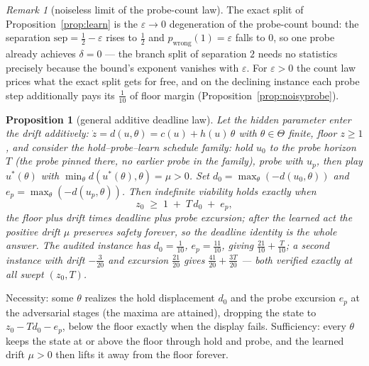 \documentclass[10pt,twocolumn]{article}
\theoremstyle{plain}
\newtheorem{proposition}[theorem]{Proposition}
\theoremstyle{definition}
\theoremstyle{remark}
\newtheorem{remark}[theorem]{Remark}
\begin{document}
\begin{remark}[noiseless limit of the probe-count law]
\label{rem:eps0}
The exact split of Proposition~\ref{prop:learn} is the
\(\varepsilon \to 0\) degeneration of the probe-count bound: the
separation \(\mathrm{sep} = \tfrac12 - \varepsilon\) rises to
\(\tfrac12\) and \(p_{\mathrm{wrong}}(1) = \varepsilon\) falls to
\(0\), so one probe already achieves \(\delta = 0\) --- the branch
split of separation \(2\) needs no statistics precisely because the
bound's exponent vanishes with \(\varepsilon\). For
\(\varepsilon > 0\) the count law prices what the exact split gets
for free, and on the declining instance each probe step additionally
pays its \(\tfrac1{10}\) of floor margin
(Proposition~\ref{prop:noisyprobe}).
\end{remark}

\begin{proposition}[general additive deadline law]\label{prop:additivelaw}
Let the hidden parameter enter the drift additively:
\(\dot z = d(u, \theta) = c(u) + h(u)\,\theta\) with
\(\theta \in \Theta\) finite, floor \(z \ge 1\), and consider the
hold--probe--learn schedule family: hold \(u_{0}\) to the probe horizon
\(T\) (the probe pinned there, no earlier probe in the family), probe
with \(u_{p}\), then play \(u^{*}(\theta)\) with
\(\min_{\theta} d(u^{*}(\theta), \theta) = \mu > 0\). Set
\(d_{0} = \max_{\theta}(-d(u_{0}, \theta))\) and
\(e_{p} = \max_{\theta}(-d(u_{p}, \theta))\). Then indefinite
viability holds exactly when
\[
z_{0} \;\ge\; 1 \;+\; T\, d_{0} \;+\; e_{p},
\]
the floor plus drift times deadline plus probe excursion; after the
learned act the positive drift \(\mu\) preserves safety forever, so
the deadline identity is the whole answer. The audited instance has
\(d_{0} = \tfrac1{10}\), \(e_{p} = \tfrac{11}{10}\), giving
\(\tfrac{21}{10} + \tfrac{T}{10}\); a second instance with drift
\(-\tfrac{3}{20}\) and excursion \(\tfrac{21}{20}\) gives
\(\tfrac{41}{20} + \tfrac{3T}{20}\) --- both verified exactly at all
swept \((z_{0}, T)\).
\end{proposition}

Necessity: some \(\theta\) realizes the hold displacement \(d_{0}\)
and the probe excursion \(e_{p}\) at the adversarial stages (the maxima
are attained), dropping the state to
\(z_{0} - T d_{0} - e_{p}\), below the floor exactly when the display
fails. Sufficiency: every \(\theta\) keeps the state at or above the
floor through hold and probe, and the learned drift \(\mu > 0\) then
lifts it away from the floor forever.
\end{document}
